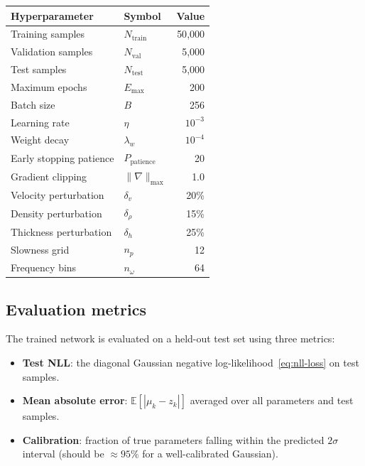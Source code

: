 \documentclass[11pt,a4paper]{article}
\theoremstyle{plain}
\theoremstyle{remark}
\begin{document}
\begin{center}
\renewcommand{\arraystretch}{1.3}
\begin{tabular}{llr}
  \toprule
  \textbf{Hyperparameter} & \textbf{Symbol} & \textbf{Value} \\
  \midrule
  Training samples    & $N_{\text{train}}$    & 50{,}000 \\
  Validation samples  & $N_{\text{val}}$      & 5{,}000 \\
  Test samples        & $N_{\text{test}}$     & 5{,}000 \\
  Maximum epochs      & $E_{\max}$            & 200 \\
  Batch size          & $B$                   & 256 \\
  Learning rate       & $\eta$                & $10^{-3}$ \\
  Weight decay        & $\lambda_w$           & $10^{-4}$ \\
  Early stopping patience & $P_{\text{patience}}$ & 20 \\
  Gradient clipping   & $\|\nabla\|_{\max}$   & 1.0 \\
  Velocity perturbation  & $\delta_v$         & 20\% \\
  Density perturbation   & $\delta_\rho$      & 15\% \\
  Thickness perturbation & $\delta_h$         & 25\% \\
  Slowness grid       & $n_p$                 & 12 \\
  Frequency bins      & $n_\omega$            & 64 \\
  \bottomrule
\end{tabular}
\end{center}

\subsection{Evaluation metrics}

The trained network is evaluated on a held-out test set using three
metrics:
\begin{itemize}[nosep]
  \item \textbf{Test NLL}: the diagonal Gaussian negative
    log-likelihood~\eqref{eq:nll-loss} on test samples.
  \item \textbf{Mean absolute error}: $\mathbb{E}[|\mu_k - z_k|]$
    averaged over all parameters and test samples.
  \item \textbf{Calibration}: fraction of true parameters falling
    within the predicted $2\sigma$ interval (should be ${\approx}95\%$
    for a well-calibrated Gaussian).
\end{itemize}
\end{document}
